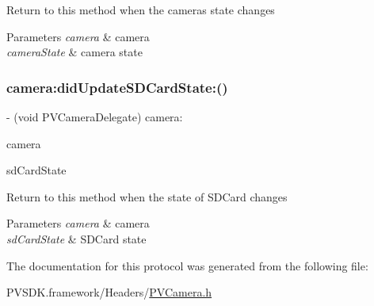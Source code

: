Return to this method when the camera\textquotesingle{}s state changes


\begin{DoxyParams}{Parameters}
{\em camera} & camera \\
\hline
{\em camera\+State} & camera state \\
\hline
\end{DoxyParams}
\mbox{\label{protocol_p_v_camera_delegate_01-p_a0d5273f1649f23a91c872e8b27e66511}} 
\subsubsection{\texorpdfstring{camera\+:did\+Update\+S\+D\+Card\+State\+:()}{camera:didUpdateSDCardState:()}}
{\footnotesize\ttfamily -\/ (void P\+V\+Camera\+Delegate) camera\+: \begin{DoxyParamCaption}\item[{(\hyperlink{interface_p_v_camera}{P\+V\+Camera} $\ast$\+\_\+\+Nonnull)}]{camera }\item[{didUpdateSDCardState:(\hyperlink{interface_p_v_camera_s_d_card_state}{P\+V\+Camera\+S\+D\+Card\+State} $\ast$\+\_\+\+Nonnull)}]{sd\+Card\+State }\end{DoxyParamCaption}\hspace{0.3cm}{\ttfamily [optional]}}

Return to this method when the state of S\+D\+Card changes


\begin{DoxyParams}{Parameters}
{\em camera} & camera \\
\hline
{\em sd\+Card\+State} & S\+D\+Card state \\
\hline
\end{DoxyParams}


The documentation for this protocol was generated from the following file\+:\begin{DoxyCompactItemize}
\item 
P\+V\+S\+D\+K.\+framework/\+Headers/\hyperlink{_p_v_camera_8h}{P\+V\+Camera.\+h}\end{DoxyCompactItemize}
